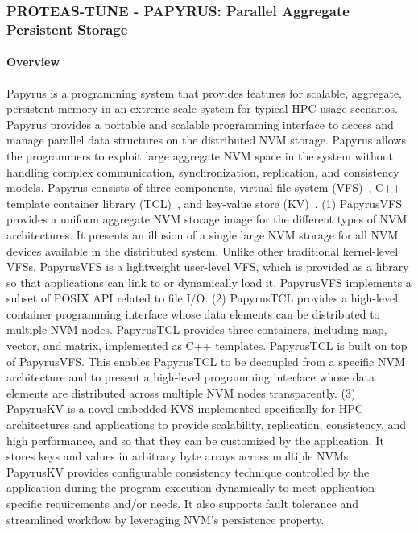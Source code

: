 \subsubsection{ PROTEAS-TUNE - PAPYRUS: Parallel Aggregate Persistent Storage}\label{s:papyrus}

\paragraph{Overview}
Papyrus is a programming system that provides features for scalable, aggregate, persistent memory in an extreme-scale system for typical HPC usage scenarios. Papyrus provides a portable and scalable programming interface to access and manage parallel data structures on the distributed NVM storage. Papyrus allows the programmers to exploit large aggregate NVM space in the system without handling complex communication, synchronization, replication, and consistency models. Papyrus consists of three components, virtual file system (VFS)~\cite{Kim:2017:DIP}, C++ template container library (TCL)~\cite{Kim:2017:DIP}, and key-value store (KV)~\cite{Kim:2017:PHP}.
(1) PapyrusVFS provides a uniform aggregate NVM storage image for the different types of NVM architectures. It presents an illusion of a single large NVM storage for all NVM devices available in the distributed system. Unlike other traditional kernel-level VFSs, PapyrusVFS is a lightweight user-level VFS, which is provided as a library so that applications can link to or dynamically load it. PapyrusVFS implements a subset of POSIX API related to file I/O. (2) PapyrusTCL provides a high-level container programming interface whose data elements can be distributed to multiple NVM nodes. PapyrusTCL provides three containers, including map, vector, and matrix, implemented as C++ templates. PapyrusTCL is built on top of PapyrusVFS. This enables PapyrusTCL to be decoupled from a specific NVM architecture and to present a high-level programming interface whose data elements are distributed across multiple NVM nodes transparently. (3) PapyrusKV is a novel embedded KVS implemented specifically for HPC architectures and applications to provide scalability, replication, consistency, and high performance, and so that they can be customized by the application. It stores keys and values in arbitrary byte arrays across multiple NVMs. PapyrusKV provides configurable consistency technique controlled by the application during the program execution dynamically to meet application-specific requirements and/or needs. It also supports fault tolerance and streamlined workflow by leveraging NVM's persistence property.

